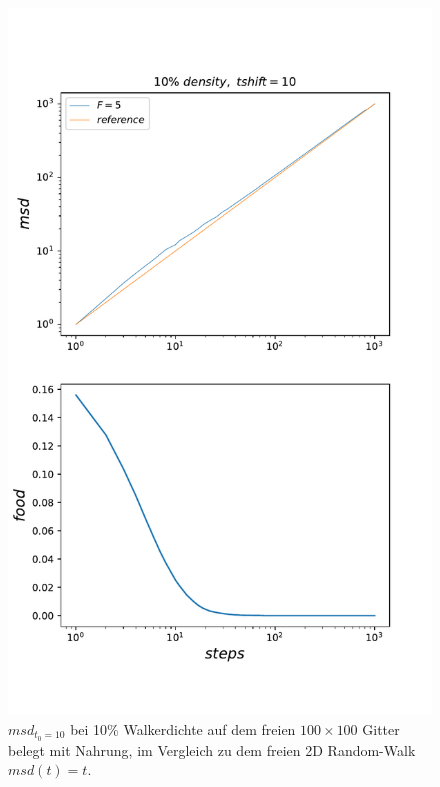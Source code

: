 \documentclass[a4paper, 12pt]{report}
\begin{document}
\begin{figure}[H]
	\centering
	\includegraphics[scale=0.75]{tshift10.pdf}
	\caption{$msd_{t_0=10}$ bei 10\% Walkerdichte auf dem freien $100\times100$ Gitter belegt mit Nahrung, im Vergleich zu dem freien 2D Random-Walk $msd(t)=t$.}
\end{figure}
\clearpage
\end{document}
